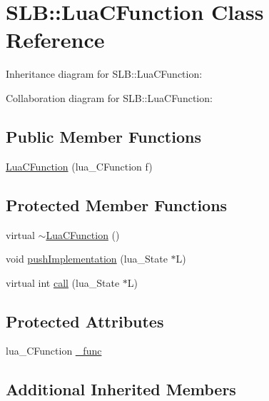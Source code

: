 \hypertarget{classSLB_1_1LuaCFunction}{}\section{S\+LB\+:\+:Lua\+C\+Function Class Reference}
\label{classSLB_1_1LuaCFunction}


Inheritance diagram for S\+LB\+:\+:Lua\+C\+Function\+:


Collaboration diagram for S\+LB\+:\+:Lua\+C\+Function\+:
\subsection*{Public Member Functions}
\begin{DoxyCompactItemize}
\item 
\hyperlink{classSLB_1_1LuaCFunction_a6c27d6764462776559590bf4e62b6db1}{Lua\+C\+Function} (lua\+\_\+\+C\+Function f)
\end{DoxyCompactItemize}
\subsection*{Protected Member Functions}
\begin{DoxyCompactItemize}
\item 
virtual \hyperlink{classSLB_1_1LuaCFunction_a4d573fd73720c45c6ed9f86ea627fdfe}{$\sim$\+Lua\+C\+Function} ()
\item 
void \hyperlink{classSLB_1_1LuaCFunction_ac1d9255f3528388150578b071f382ba9}{push\+Implementation} (lua\+\_\+\+State $\ast$L)
\item 
virtual int \hyperlink{classSLB_1_1LuaCFunction_a44a124fe323f52b0d4c861c51d62328e}{call} (lua\+\_\+\+State $\ast$L)
\end{DoxyCompactItemize}
\subsection*{Protected Attributes}
\begin{DoxyCompactItemize}
\item 
lua\+\_\+\+C\+Function \hyperlink{classSLB_1_1LuaCFunction_ae19c24c4711753f003948fa27011b9eb}{\+\_\+func}
\end{DoxyCompactItemize}
\subsection*{Additional Inherited Members}


